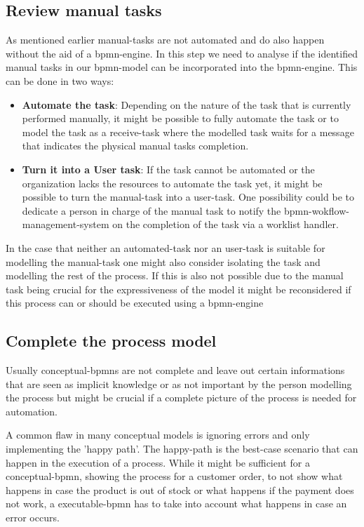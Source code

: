 \subsection{Review manual tasks}
As mentioned earlier \gls{manual-task}s are not automated and do also happen without the aid of a \gls{bpmn-engine}. In this step we need to analyse if the identified manual tasks in our \gls{bpmn}-model can be incorporated into the \gls{bpmn-engine}. This can be done in two ways:
\begin{itemize}
	\item \textbf{Automate the task}: Depending on the nature of the task that is currently performed manually, it might be possible to fully automate the task or to model the task as a \gls{receive-task} where the modelled task waits for a message that indicates the physical manual tasks completion.
	\item \textbf{Turn it into a User task}: If the task cannot be automated or the organization lacks the resources to automate the task yet, it might be possible to turn the \gls{manual-task} into a \gls{user-task}. One possibility could be to dedicate a person in charge of the manual task to notify the \gls{bpmn-wokflow-management-system} on the completion of the task via a worklist handler. \cite{stefanov2014business}
\end{itemize}

In the case that neither an \gls{automated-task} nor an \gls{user-task} is suitable for modelling the \gls{manual-task} one might also consider isolating the task and modelling the rest of the process. If this is also not possible due to the manual task being crucial for the expressiveness of the model it might be reconsidered if this process can or should be executed using a \gls{bpmn-engine}\cite[p.~228]{freund2019real}

\subsection{Complete the process model}
Usually \gls{conceptual-bpmn}s are not complete and leave out certain informations that are seen as implicit knowledge or as not important by the person modelling the process but might be crucial if a complete picture of the process is needed for automation. 

A common flaw in many conceptual models is ignoring errors and only implementing the 'happy path'. The \gls{happy-path} is the best-case scenario that can happen in the execution of a process. While it might be sufficient for a \gls{conceptual-bpmn}, showing the process for a customer order, to not show what happens in case the product is out of stock or what happens if the payment does not work, a \gls{executable-bpmn} has to take into account what happens in case an error occurs. 

